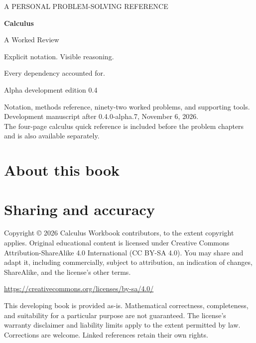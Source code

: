 \documentclass[11pt,oneside,openany]{book}
\begin{document}
\frontmatter
\begin{titlepage}
\color{Ink}
\vspace*{0.7in}
{\sffamily\large A PERSONAL PROBLEM-SOLVING REFERENCE\par}
\vspace{0.5in}
{\sffamily\bfseries\fontsize{40}{46}\selectfont Calculus\par}
\vspace{0.15in}
{\sffamily\LARGE A Worked Review\par}
\vspace{0.45in}
{\Large Explicit notation. Visible reasoning.\par}
{\Large Every dependency accounted for.\par}
\vfill
{\sffamily\large Alpha development edition 0.4\par}
\medskip
Notation, methods reference, ninety-two worked problems, and supporting tools.\\
Development manuscript after 0.4.0-alpha.7, November 6, 2026.\\
The four-page calculus quick reference is included before the problem chapters
and is also available separately.
\end{titlepage}
\chapter*{About this book}
\chapter*{Sharing and accuracy}
Copyright \copyright{} 2026 Calculus Workbook contributors, to the extent copyright applies. Original educational content is licensed under Creative Commons Attribution-ShareAlike 4.0 International (CC BY-SA 4.0). You may share and adapt it, including commercially, subject to attribution, an indication of changes, ShareAlike, and the license's other terms.

\url{https://creativecommons.org/licenses/by-sa/4.0/}

This developing book is provided as-is. Mathematical correctness, completeness, and suitability for a particular purpose are not guaranteed. The license's warranty disclaimer and liability limits apply to the extent permitted by law. Corrections are welcome. Linked references retain their own rights.

\tableofcontents
\mainmatter
\end{document}
